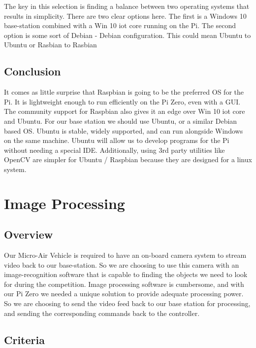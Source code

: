 \documentclass[letterpaper, 10, draftclsnofoot, onecolumn, compsoc]{IEEEtran}
\begin{document}
The key in this selection is finding a balance between two 
operating systems that results in simplicity. There are two clear 
options here. The first is a Windows 10 base-station combined with 
a Win 10 iot core running on the Pi. The second option is some sort 
of Debian - Debian configuration. This could mean Ubuntu to Ubuntu 
or Rasbian to Rasbian


\subsection{Conclusion}

It comes as little surprise that Raspbian is going to be the 
preferred OS for the Pi. It is lightweight enough to run 
efficiently on the Pi Zero, even with a GUI. The community support 
for Raspbian also gives it an edge over Win 10 iot core and Ubuntu. 
For our base station we should use Ubuntu, or a similar Debian 
based OS. Ubuntu is stable, widely supported, and can run alongside 
Windows on the same machine. Ubuntu will allow us to develop 
programs for the Pi without needing a special IDE. Additionally, 
using 3rd party utilities like OpenCV are simpler for Ubuntu / 
Raspbian because they are designed for a linux system.  





\section{Image Processing}

\subsection{Overview}

Our Micro-Air Vehicle is required to have an on-board camera system 
to stream video back to our base-station. So we are choosing to use 
this camera with an image-recognition software that is capable to 
finding the objects we need to look for during the competition. 
Image processing software is cumbersome, and with our Pi Zero we 
needed a unique solution to provide adequate processing power. So 
we are choosing to send the video feed back to our base station for 
processing, and sending the corresponding commands back to the 
controller. 

\subsection{Criteria}
\end{document}
